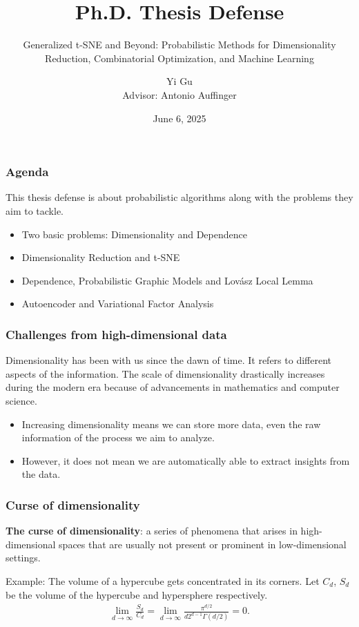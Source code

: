 \documentclass{beamer}
\title{Ph.D. Thesis Defense}
\subtitle{Generalized t-SNE and Beyond: Probabilistic Methods for Dimensionality Reduction, Combinatorial Optimization, and Machine Learning}
\author[Yi Gu]{Yi Gu \texorpdfstring{\\}{} Advisor: Antonio Auffinger}
\institute{Department of Mathematics, Northwestern University}
\date{June 6, 2025}
\newcommand{\lovasz}{{Lov\'asz}\xspace}
\begin{document}
\frame{\titlepage}

\begin{frame}\frametitle{Agenda}
  This thesis defense is about probabilistic algorithms along with the problems they aim to tackle.
  \begin{itemize}
    \item[$\bullet$] Two basic problems: Dimensionality and Dependence
    \item[$\bullet$] Dimensionality Reduction and t-SNE
    \item[$\bullet$] Dependence, Probabilistic Graphic Models and \lovasz Local Lemma
    \item[$\bullet$] Autoencoder and Variational Factor Analysis
  \end{itemize}
\end{frame}

\begin{frame}
  \frametitle{Challenges from high-dimensional data}
  Dimensionality has been with us since the dawn of time. It refers to different aspects of the information. The scale of dimensionality drastically increases during the modern era because of advancements in mathematics and computer science.
  \begin{itemize}
    \item[$\bullet$] Increasing dimensionality means we can store more data, even the raw information of the process we aim to analyze.
    \item[$\bullet$] However, it does not mean we are automatically able to extract insights from the data.
  \end{itemize}
\end{frame}

\begin{frame}
  \frametitle{Curse of dimensionality}
  \textbf{The curse of dimensionality}: a series of phenomena that arises in high-dimensional spaces that are usually not present or prominent in low-dimensional settings.

  \vspace{1em}
  Example: The volume of a hypercube gets concentrated in its corners. Let $C_d$, $S_d$ be the volume of the hypercube and hypersphere respectively.
  \begin{align}
    \lim_{d \to \infty} \frac{S_d}{C_d} = \lim_{d \to \infty} \frac{\pi^{d/2}}{d2^{d-1}\Gamma(d/2)} = 0.
  \end{align}
\end{frame}
\end{document}
